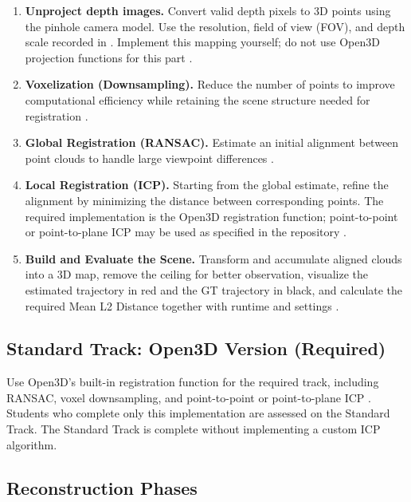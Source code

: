 \documentclass[11pt]{article}
\newcommand{\code}[1]{\texttt{\detokenize{#1}}}
\begin{document}
\begin{enumerate}
\item \textbf{Unproject depth images.} Convert valid depth pixels to 3D points using the pinhole camera model. Use the resolution, field of view (FOV), and depth scale recorded in \code{intrinsics.json}. Implement this mapping yourself; do not use Open3D projection functions for this part \cite{hartley2004multiple}.
\item \textbf{Voxelization (Downsampling).} Reduce the number of points to improve computational efficiency while retaining the scene structure needed for registration \cite{open3dglobal}.
\item \textbf{Global Registration (RANSAC).} Estimate an initial alignment between point clouds to handle large viewpoint differences \cite{fischler1981ransac,open3dglobal}.
\item \textbf{Local Registration (ICP).} Starting from the global estimate, refine the alignment by minimizing the distance between corresponding points. The required implementation is the Open3D registration function; point-to-point or point-to-plane ICP may be used as specified in the repository \cite{chen1992object,open3dglobal}.
\item \textbf{Build and Evaluate the Scene.} Transform and accumulate aligned clouds into a 3D map, remove the ceiling for better observation, visualize the estimated trajectory in red and the GT trajectory in black, and calculate the required Mean L2 Distance together with runtime and settings \cite{replica2019}.
\end{enumerate}

\subsection{Standard Track: Open3D Version (Required)}
Use Open3D's built-in registration function for the required track, including RANSAC, voxel downsampling, and point-to-point or point-to-plane ICP \cite{open3dglobal}. Students who complete only this implementation are assessed on the Standard Track. The Standard Track is complete without implementing a custom ICP algorithm.

\subsection{Reconstruction Phases}
\end{document}
